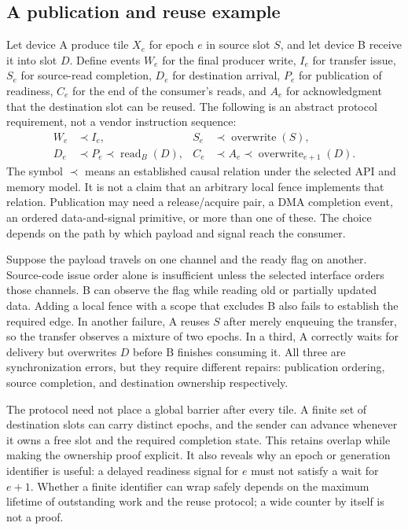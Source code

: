 \subsection{A publication and reuse example}

Let device A produce tile $X_e$ for epoch $e$ in source slot $S$, and let device B receive it into slot $D$. Define events $W_e$ for the final producer write, $I_e$ for transfer issue, $S_e$ for source-read completion, $D_e$ for destination arrival, $P_e$ for publication of readiness, $C_e$ for the end of the consumer's reads, and $A_e$ for acknowledgment that the destination slot can be reused. The following is an abstract protocol requirement, not a vendor instruction sequence:
\begin{align}
 W_e &\prec I_e, & S_e &\prec \operatorname{overwrite}(S), \label{eq:u007-source}\\
 D_e &\prec P_e \prec \operatorname{read}_B(D), &
 C_e &\prec A_e \prec \operatorname{overwrite}_{e+1}(D). \label{eq:u007-dest}
\end{align}
The symbol $\prec$ means an established causal relation under the selected API and memory model. It is not a claim that an arbitrary local fence implements that relation. Publication may need a release/acquire pair, a DMA completion event, an ordered data-and-signal primitive, or more than one of these. The choice depends on the path by which payload and signal reach the consumer.

Suppose the payload travels on one channel and the ready flag on another. Source-code issue order alone is insufficient unless the selected interface orders those channels. B can observe the flag while reading old or partially updated data. Adding a local fence with a scope that excludes B also fails to establish the required edge. In another failure, A reuses $S$ after merely enqueuing the transfer, so the transfer observes a mixture of two epochs. In a third, A correctly waits for delivery but overwrites $D$ before B finishes consuming it. All three are synchronization errors, but they require different repairs: publication ordering, source completion, and destination ownership respectively.

The protocol need not place a global barrier after every tile. A finite set of destination slots can carry distinct epochs, and the sender can advance whenever it owns a free slot and the required completion state. This retains overlap while making the ownership proof explicit. It also reveals why an epoch or generation identifier is useful: a delayed readiness signal for $e$ must not satisfy a wait for $e+1$. Whether a finite identifier can wrap safely depends on the maximum lifetime of outstanding work and the reuse protocol; a wide counter by itself is not a proof.

